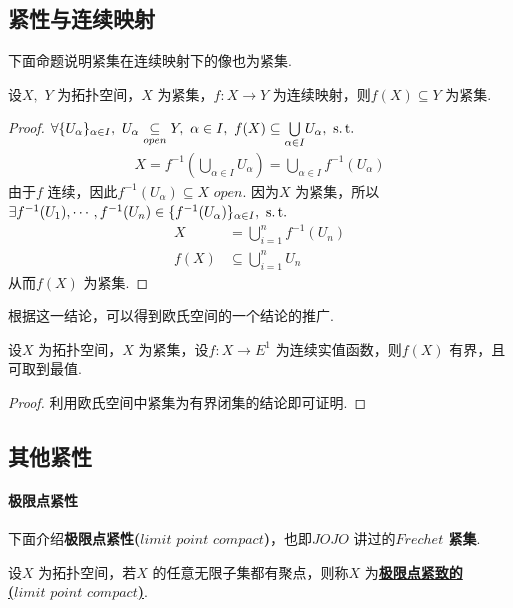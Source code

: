 \subsection{紧性与连续映射}
	下面命题说明紧集在连续映射下的像也为紧集.
	\begin{proposition}\label{prop 2.2.2}
		设$X , \,\, Y$ 为拓扑空间，$X$ 为紧集，$f : X \longrightarrow Y$ 为连续映射，则$f(X) \subseteq Y$ 为紧集.
		
		\vspace*{2em}
		\begin{proof}
			$\forall \{ U_\alpha \}_{\alpha \in I} , \,\, U_\alpha \underset{open}{\subseteq} Y , \,\, \alpha \in I , \,\, f(X) \subseteq \underset{\alpha \in I}{\bigcup}{U_\alpha} , \,\, \operatorname{s.t.}$
			\begin{align}
				X = f^{-1}(\bigcup_{\alpha \in I}{U_\alpha}) = \bigcup_{\alpha \in I}{f^{-1}(U_\alpha)}
			\end{align}
			由于$f$ 连续，因此$f^{-1}(U_\alpha) \subseteq X \,\, open$. 因为$X$ 为紧集，所以\\
			$\exists f^{-1}(U_1) , \cdots , f^{-1}(U_n) \in \{ f^{-1}(U_\alpha) \}_{\alpha \in I} , \,\, \operatorname{s.t.}$
			\begin{align}
				X &= \bigcup_{i = 1}^{n}{f^{-1}(U_n)} \\
				f(X) &\subseteq \bigcup_{i = 1}^{n}{U_n}
			\end{align}
			从而$f(X)$ 为紧集.
		\end{proof}
	\end{proposition}
	
	\vspace*{2em}
	根据这一结论，可以得到欧氏空间的一个结论的推广.
	\begin{corollary}\label{cor 2.2.2}
		设$X$ 为拓扑空间，$X$ 为紧集，设$f : X \longrightarrow E^1$ 为连续实值函数，则$f(X)$ 有界，且可取到最值.
		
		\vspace*{2em}
		\begin{proof}
			利用欧氏空间中紧集为有界闭集的结论即可证明.
		\end{proof}
	\end{corollary}

\newpage
\subsection{其他紧性}
\paragraph{极限点紧性}
	下面介绍\textbf{极限点紧性($limit \,\, point \,\, compact$)}，也即$JOJO$ 讲过的\textbf{$Frechet$ 紧集}.
	\begin{defn}\label{dedf 2.2.1}
		设$X$ 为拓扑空间，若$X$ 的任意无限子集都有聚点，则称$X$ 为\underline{\textbf{极限点紧致的}} \\
		\underline{\textbf{($limit \,\, point \,\, compact$)}}.
	\end{defn}


